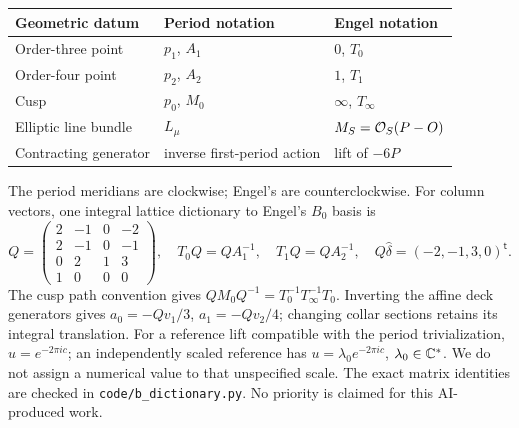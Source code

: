 \begin{center}\small
\begin{tabular}{lll}
\toprule
Geometric datum & Period notation & Engel notation\\
\midrule
Order-three point & $p_1$, $A_1$ & $0$, $T_0$\\
Order-four point & $p_2$, $A_2$ & $1$, $T_1$\\
Cusp & $p_0$, $M_0$ & $\infty$, $T_\infty$\\
Elliptic line bundle & $L_\mu$ & $M_S=\mathcal O_S(P-O)$\\
Contracting generator & inverse first-period action & lift of $-6P$\\
\bottomrule
\end{tabular}
\end{center}
The period meridians are clockwise; Engel's are counterclockwise.
For column vectors, one integral lattice dictionary to Engel's $B_0$ basis is
\[
Q=\begin{pmatrix}2&-1&0&-2\\2&-1&0&-1\\0&2&1&3\\1&0&0&0\end{pmatrix},
\quad T_0Q=QA_1^{-1},\quad T_1Q=QA_2^{-1},\quad
Q\hat\delta=(-2,-1,3,0)^{\mathsf t}.
\]
The cusp path convention gives
$QM_0Q^{-1}=T_0^{-1}T_\infty^{-1}T_0$.
Inverting the affine deck generators gives $a_0=-Qv_1/3$,
$a_1=-Qv_2/4$; changing collar sections retains its integral translation.
For a reference lift compatible with the period trivialization,
$u=e^{-2\pi i c}$; an independently scaled reference has
$u=\lambda_0e^{-2\pi i c}$, $\lambda_0\in\mathbb C^*$.
We do not assign a numerical value to that unspecified scale.
The exact matrix identities are checked in \texttt{code/b\_dictionary.py}.
No priority is claimed for this AI-produced work.
\clearpage
